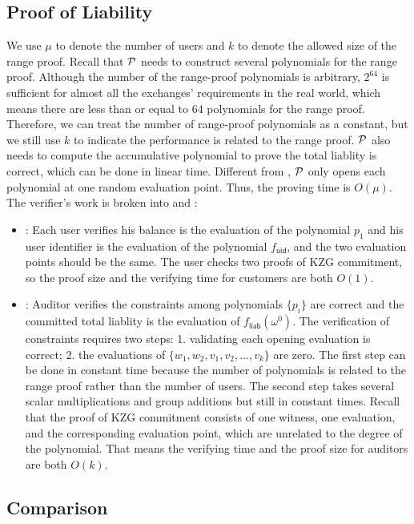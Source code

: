 \subsection{Proof of Liability}
We use $\mu$ to denote the number of users and $k$ to denote the allowed size of the range proof. Recall that $\mathcal{P}$ needs to construct several polynomials for the range proof. Although the number of the range-proof polynomials is arbitrary, $2^{64}$ is sufficient for almost all the exchanges' requirements in the real world, which means there are less than or equal to 64 polynomials for the range proof. Therefore, we can treat the number of range-proof polynomials as a constant, but we still use $k$ to indicate the performance is related to the range proof. $\mathcal{P}$ also needs to compute the accumulative polynomial to prove the total liablity is correct, which can be done in linear time. Different from \bootstrap, $\mathcal{P}$ only opens each polynomial at one random evaluation point. Thus, the proving time is $O(\mu)$.
The verifier's work is broken into \userproof and \pol:
\begin{itemize}
\item \userproof: Each user verifies his balance is the evaluation of the polynomial $p_1$ and his user identifier is the evaluation of the polynomial $f_\mathsf{uid}$, and the two evaluation points should be the same. The user checks two proofs of KZG commitment, so the proof size and the verifying time for customers are both $O(1)$.
\item \pol: Auditor verifies the constraints among polynomials $\{p_i\}$ are correct and the committed total liablity is the evaluation of $f_\mathsf{liab}(\omega^0)$. The verification of constraints requires two steps: 1. validating each opening evaluation is correct; 2. the evaluations of $\{w_1,w_2,v_1,v_2,\dots,v_k\}$ are zero. The first step can be done in constant time because the number of polynomials is related to the range proof rather than the number of users. The second step takes several scalar multiplications and group additions but still in constant times. Recall that the proof of KZG commitment consists of one witness, one evaluation, and the corresponding evaluation point, which are unrelated to the degree of the polynomial. That means the verifying time and the proof size for auditors are both $O(k)$.
\end{itemize}

\subsection{Comparison}

